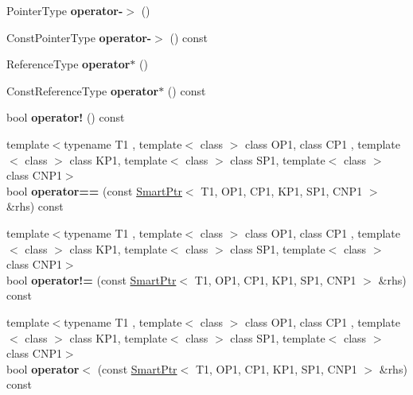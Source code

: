\begin{DoxyCompactItemize}
\item 
\hypertarget{classLoki_1_1SmartPtr_a6e4cd5ef0251b9e864a5948c00a85331}{}Pointer\+Type {\bfseries operator-\/$>$} ()\label{classLoki_1_1SmartPtr_a6e4cd5ef0251b9e864a5948c00a85331}

\item 
\hypertarget{classLoki_1_1SmartPtr_ab1246ff061b41899edc5b8af5f0ba20d}{}Const\+Pointer\+Type {\bfseries operator-\/$>$} () const \label{classLoki_1_1SmartPtr_ab1246ff061b41899edc5b8af5f0ba20d}

\item 
\hypertarget{classLoki_1_1SmartPtr_a8f150af9c1a84390e421c814c5a8d460}{}Reference\+Type {\bfseries operator$\ast$} ()\label{classLoki_1_1SmartPtr_a8f150af9c1a84390e421c814c5a8d460}

\item 
\hypertarget{classLoki_1_1SmartPtr_afcd98ed4ca3cd91ffe9b034bfb023a1b}{}Const\+Reference\+Type {\bfseries operator$\ast$} () const \label{classLoki_1_1SmartPtr_afcd98ed4ca3cd91ffe9b034bfb023a1b}

\item 
\hypertarget{classLoki_1_1SmartPtr_adbf71990e5a620acfbbc4193c4cb9262}{}bool {\bfseries operator!} () const \label{classLoki_1_1SmartPtr_adbf71990e5a620acfbbc4193c4cb9262}

\item 
\hypertarget{classLoki_1_1SmartPtr_a136af120315e59fdd5d0a97ba2e736a9}{}{\footnotesize template$<$typename T1 , template$<$ class $>$ class O\+P1, class C\+P1 , template$<$ class $>$ class K\+P1, template$<$ class $>$ class S\+P1, template$<$ class $>$ class C\+N\+P1$>$ }\\bool {\bfseries operator==} (const \hyperlink{classLoki_1_1SmartPtr}{Smart\+Ptr}$<$ T1, O\+P1, C\+P1, K\+P1, S\+P1, C\+N\+P1 $>$ \&rhs) const \label{classLoki_1_1SmartPtr_a136af120315e59fdd5d0a97ba2e736a9}

\item 
\hypertarget{classLoki_1_1SmartPtr_abbf2678829356227fc9a6eec2c3eb5b3}{}{\footnotesize template$<$typename T1 , template$<$ class $>$ class O\+P1, class C\+P1 , template$<$ class $>$ class K\+P1, template$<$ class $>$ class S\+P1, template$<$ class $>$ class C\+N\+P1$>$ }\\bool {\bfseries operator!=} (const \hyperlink{classLoki_1_1SmartPtr}{Smart\+Ptr}$<$ T1, O\+P1, C\+P1, K\+P1, S\+P1, C\+N\+P1 $>$ \&rhs) const \label{classLoki_1_1SmartPtr_abbf2678829356227fc9a6eec2c3eb5b3}

\item 
\hypertarget{classLoki_1_1SmartPtr_afee57012d545be4f5ffb7d58b57adf6b}{}{\footnotesize template$<$typename T1 , template$<$ class $>$ class O\+P1, class C\+P1 , template$<$ class $>$ class K\+P1, template$<$ class $>$ class S\+P1, template$<$ class $>$ class C\+N\+P1$>$ }\\bool {\bfseries operator$<$} (const \hyperlink{classLoki_1_1SmartPtr}{Smart\+Ptr}$<$ T1, O\+P1, C\+P1, K\+P1, S\+P1, C\+N\+P1 $>$ \&rhs) const \label{classLoki_1_1SmartPtr_afee57012d545be4f5ffb7d58b57adf6b}


\end{DoxyCompactItemize}
